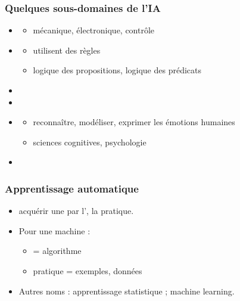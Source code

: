 \begin{frame}
  \frametitle{Quelques sous-domaines de l'IA}
  \begin{itemize}
  \item {}
    \begin{itemize}
    \item mécanique, électronique, contrôle
    \end{itemize}
  \item {}
    \begin{itemize}
    \item utilisent des règles 
    \item logique des propositions, logique des prédicats
    \end{itemize}
  \item {}
  \item {}
  \item {} 
    \begin{itemize}
    \item reconnaître, modéliser, exprimer les émotions humaines
    \item sciences cognitives, psychologie
    \end{itemize}
  \item {}
  \end{itemize}
  \pause {}
\end{frame}

\begin{frame}
  \frametitle{Apprentissage automatique}
  \begin{itemize}
  \item {}
    \pause
    acquérir une  par l', la pratique.
  \item Pour une  machine :
    \begin{itemize}
    \item {} = algorithme
    \item {} pratique = exemples, données
    \end{itemize}
    \pause
  \item Autres noms : apprentissage statistique ; machine learning.
  \end{itemize}
\end{frame}

